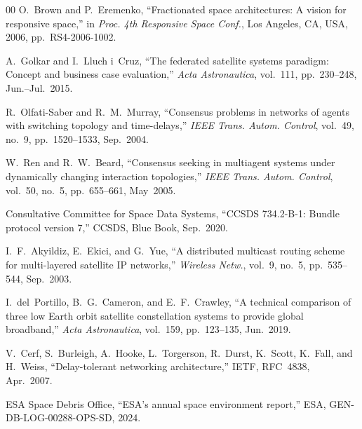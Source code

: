 \documentclass[journal]{IEEEtran}
\begin{document}
\begin{thebibliography}{00}
O.~Brown and P.~Eremenko, ``Fractionated space architectures: A vision for responsive space,'' in \emph{Proc. 4th Responsive Space Conf.}, Los Angeles, CA, USA, 2006, pp.~RS4-2006-1002.

A.~Golkar and I.~Lluch i~Cruz, ``The federated satellite systems paradigm: Concept and business case evaluation,'' \emph{Acta Astronautica}, vol.~111, pp.~230--248, Jun.--Jul.~2015.

R.~Olfati-Saber and R.~M.~Murray, ``Consensus problems in networks of agents with switching topology and time-delays,'' \emph{IEEE Trans. Autom. Control}, vol.~49, no.~9, pp.~1520--1533, Sep.~2004.

W.~Ren and R.~W.~Beard, ``Consensus seeking in multiagent systems under dynamically changing interaction topologies,'' \emph{IEEE Trans. Autom. Control}, vol.~50, no.~5, pp.~655--661, May~2005.

Consultative Committee for Space Data Systems, ``CCSDS 734.2-B-1: Bundle protocol version 7,'' CCSDS, Blue Book, Sep.~2020.

I.~F.~Akyildiz, E.~Ekici, and G.~Yue, ``A distributed multicast routing scheme for multi-layered satellite IP networks,'' \emph{Wireless Netw.}, vol.~9, no.~5, pp.~535--544, Sep.~2003.

I.~del~Portillo, B.~G.~Cameron, and E.~F.~Crawley, ``A technical comparison of three low Earth orbit satellite constellation systems to provide global broadband,'' \emph{Acta Astronautica}, vol.~159, pp.~123--135, Jun.~2019.

V.~Cerf, S.~Burleigh, A.~Hooke, L.~Torgerson, R.~Durst, K.~Scott, K.~Fall, and H.~Weiss, ``Delay-tolerant networking architecture,'' IETF, RFC~4838, Apr.~2007.

ESA Space Debris Office, ``ESA's annual space environment report,'' ESA, GEN-DB-LOG-00288-OPS-SD, 2024.

\end{thebibliography}
\end{document}
